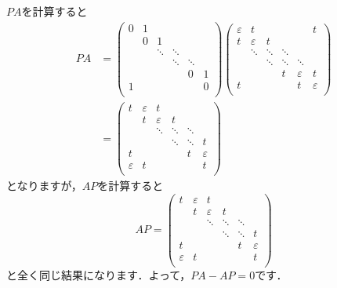 \documentclass[a4paper,pdflatex,ja=standard]{bxjsarticle}
\begin{document}
\begin{enumerate}
\begin{enumerate}
    $PA$を計算すると
    \begin{align}
      PA
      &=
      \begin{pmatrix}
        0 & 1 &   &   &   &     \\
          & 0 & 1 &   &   &     \\
          &   & \ddots &  \ddots  &  &     \\
          &   &        &  \ddots  & \ddots &    \\
          &   &        &          &      0 & 1  \\        
        1 &   &        &          &       & 0 \\
      \end{pmatrix}
      \begin{pmatrix}
        \varepsilon & t &   &   &   &   t  \\
        t & \varepsilon & t &   &   &     \\
          &  \ddots & \ddots &  \ddots  &  &     \\
          &   &    \ddots   &  \ddots  & \ddots &    \\
          &   &        &     t     &      \varepsilon & t  \\        
        t &   &        &          &    t   & \varepsilon \\
      \end{pmatrix}
      \nonumber
      \\
      &=
      \begin{pmatrix}
        t & \varepsilon & t  &   &   &     \\
          & t & \varepsilon & t  &   &     \\
          &   & \ddots &  \ddots  &\ddots  &     \\
          &   &        &  \ddots  & \ddots & t  \\
        t  &   &        &          &      t & \varepsilon  \\        
        \varepsilon & t  &        &          &       & t \\
      \end{pmatrix}
    \end{align}
    となりますが，$AP$を計算すると
    \begin{equation}
      AP
      =
      \begin{pmatrix}
        t & \varepsilon & t  &   &   &     \\
          & t & \varepsilon & t  &   &     \\
          &   & \ddots &  \ddots  &\ddots  &     \\
          &   &        &  \ddots  & \ddots & t  \\
        t  &   &        &          &      t & \varepsilon  \\        
        \varepsilon & t  &        &          &       & t \\
      \end{pmatrix}
    \end{equation}
    と全く同じ結果になります．よって，$PA-AP=0$です．



\end{enumerate}
\end{enumerate}
\end{document}
